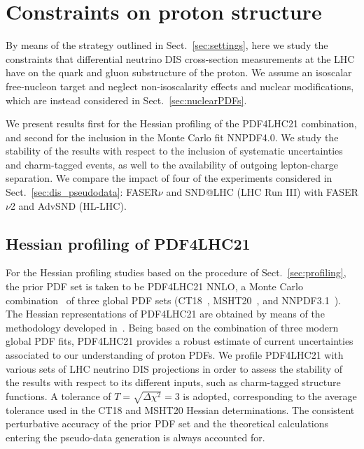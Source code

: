 \clearpage
\section{Constraints on proton structure}
\label{sec:protonPDFs}

By means of the strategy outlined in Sect.~\ref{sec:settings}, here we study the constraints that differential neutrino DIS
cross-section measurements at the LHC have on the quark and gluon substructure of the proton.
%
We assume an isoscalar free-nucleon target and neglect non-isoscalarity effects and nuclear modifications,
which are instead considered in Sect.~\ref{sec:nuclearPDFs}.

We present results first for the Hessian profiling of the PDF4LHC21 combination,
and second for the inclusion in the Monte Carlo fit NNPDF4.0.
%
We study the stability of the results with respect to the inclusion of systematic uncertainties
and  charm-tagged events, as well to the availability of outgoing lepton-charge separation.
%
We compare the impact of four of the experiments considered in Sect.~\ref{sec:dis_pseudodata}:
FASER$\nu$ and SND@LHC (LHC Run III) with FASER$\nu$2 and AdvSND (HL-LHC).

\subsection{Hessian profiling of PDF4LHC21}
\label{sec:pdf4lhc21}

For the Hessian profiling studies based on the procedure of Sect.~\ref{sec:profiling}, the prior PDF set is taken to
be PDF4LHC21 NNLO, a Monte Carlo combination~\cite{Watt:2012tq,Carrazza:2015hva} of three global PDF sets (CT18~\cite{Hou:2019efy},
MSHT20~\cite{Bailey:2020ooq}, and NNPDF3.1~\cite{NNPDF:2017mvq}).
%
The Hessian representations of PDF4LHC21 are obtained by means of the methodology developed in~\cite{Gao:2013bia,Carrazza:2015aoa}.
%
Being based on the combination of three modern global PDF fits, PDF4LHC21 provides a robust estimate
of  current uncertainties associated to our understanding of proton PDFs.
%
We profile PDF4LHC21 with various sets of LHC neutrino DIS projections in order to assess the stability
of the results with respect to its different inputs, such as charm-tagged structure functions.
%
A tolerance of $T = \sqrt{\Delta \chi^2}=3$ is adopted, corresponding to the average tolerance
used in the CT18 and MSHT20 Hessian determinations.
%
The consistent perturbative accuracy of the prior PDF set and the theoretical calculations entering
the pseudo-data generation is always accounted for.




